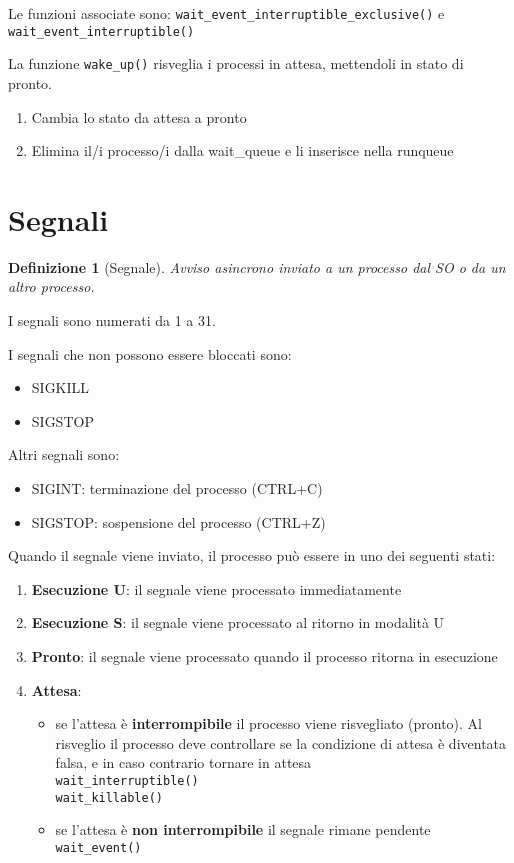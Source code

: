 \documentclass[12pt, a4paper]{report}
\newtheorem{definition}{Definizione}
\begin{document}
Le funzioni associate sono: \texttt{wait\_event\_interruptible\_exclusive()} e
\texttt{wait\_event\_interruptible()}

La funzione \texttt{wake\_up()} risveglia i processi in attesa, mettendoli in
stato di pronto.
\begin{enumerate}
	\item Cambia lo stato da attesa a pronto
	\item Elimina il/i processo/i dalla wait\_queue e li inserisce nella
		runqueue
\end{enumerate}
\section{Segnali}
\begin{definition}[Segnale]
	Avviso asincrono inviato a un processo dal SO o da un altro processo.
\end{definition}
I segnali sono numerati da 1 a 31.

I segnali che non possono essere bloccati sono:
\begin{itemize}
	\item SIGKILL
	\item SIGSTOP
\end{itemize}
Altri segnali sono:
\begin{itemize}
	\item SIGINT: terminazione del processo (CTRL+C)
	\item SIGSTOP: sospensione del processo (CTRL+Z)
\end{itemize}
Quando il segnale viene inviato, il processo può essere in uno dei seguenti
stati:
\begin{enumerate}
	\item \textbf{Esecuzione U}: il segnale viene processato immediatamente
	\item \textbf{Esecuzione S}: il segnale viene processato al ritorno in
		modalità U
	\item \textbf{Pronto}: il segnale viene processato quando il processo
		ritorna in esecuzione
	\item \textbf{Attesa}:
		\begin{itemize}
			\item se l'attesa è \textbf{interrompibile} il processo viene
				risvegliato (pronto). Al risveglio il processo deve
				controllare se la condizione di attesa è diventata falsa, e
				in caso contrario tornare in attesa\\
				\texttt{wait\_interruptible()}\\
				\texttt{wait\_killable()}
			\item se l'attesa è \textbf{non interrompibile} il segnale rimane
				pendente\\
				\texttt{wait\_event()}
		\end{itemize}
\end{enumerate}
\end{document}
